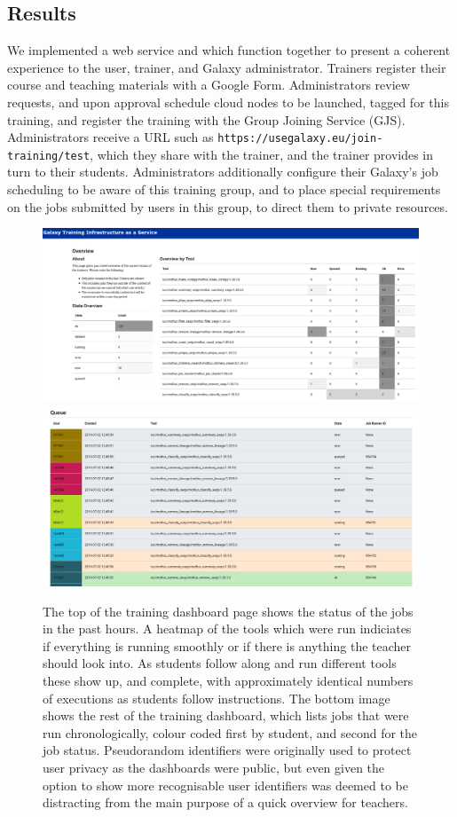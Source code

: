 \documentclass[a4paper,num-refs]{oup-contemporary}
\begin{document}
\subsection{Results}
We implemented a web service and which function together to present a coherent experience to the user, trainer, and Galaxy administrator. Trainers register their course and teaching materials with a Google Form. Administrators review requests, and upon approval schedule cloud nodes to be launched, tagged for this training, and register the training with the Group Joining Service (GJS). Administrators receive a URL such as \texttt{https://usegalaxy.eu/join-training/test}, which they share with the trainer, and the trainer provides in turn to their students. Administrators additionally configure their Galaxy's job scheduling to be aware of this training group, and to place special requirements on the jobs submitted by users in this group, to direct them to private resources.

\begin{figure}[bt!]
\centering
\includegraphics[width=\linewidth]{images/dashboard.png}
\includegraphics[width=\linewidth]{images/queue.png}
	\caption{The top of the training dashboard page shows the status of the jobs in the past hours. A heatmap of the tools which were run indiciates if everything is running smoothly or if there is anything the teacher should look into. As students follow along and run different tools these show up, and complete, with approximately identical numbers of executions as students follow instructions. The bottom image shows the rest of the training dashboard, which lists jobs that were run chronologically, colour coded first by student, and second for the job status. Pseudorandom identifiers were originally used to protect user privacy as the dashboards were public, but even given the option to show more recognisable user identifiers was deemed to be distracting from the main purpose of a quick overview for teachers.}\label{figure:dashboard}
\end{figure}
\end{document}
